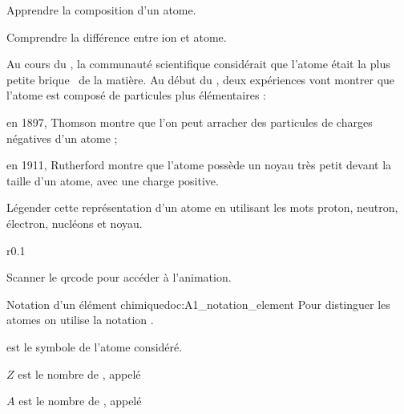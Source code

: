 \teteSndAtom



\begin{objectifs}
  \item Apprendre la composition d'un atome.
  \item Comprendre la différence entre ion et atome.
\end{objectifs}

\begin{contexte}
  Au cours du , la communauté scientifique considérait que l'atome était la plus petite \og brique \fg\, de la matière.
  Au début du , deux expériences vont montrer que l'atome est composé de particules plus élémentaires :
  \begin{listePoints}
    \item en 1897, Thomson montre que l'on peut arracher des particules de charges négatives d'un atome ;
    \item en 1911, Rutherford montre que l'atome possède un noyau très petit devant la taille d'un atome, avec une charge positive.
  \end{listePoints}
  
\end{contexte}



\numeroQuestion
Légender cette représentation d'un atome en utilisant les mots proton, neutron, électron, nucléons et noyau.

\begin{center}
\end{center}

\begin{wrapfigure}[1]{r}{0.1\linewidth}
  \vspace*{-60pt}
\end{wrapfigure}

\mesure Scanner le qrcode pour accéder à l'animation.


\begin{doc}{Notation d'un élément chimique}{doc:A1_notation_element}
  Pour distinguer les atomes on utilise la notation .
  \begin{encart}
    \begin{listePoints}
      \item {} est le symbole de l'atome considéré.
      \item $Z$ est le nombre de , appelé 
      \item $A$ est le nombre de , appelé 
    \end{listePoints}
  \end{encart}
\end{doc}

